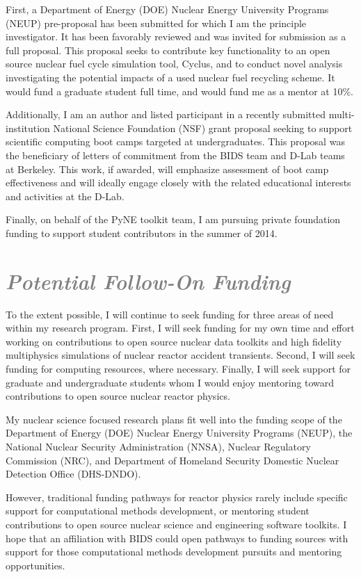 \documentclass[a4paper, 10pt]{article}
\begin{document}
First, a Department of Energy (DOE) Nuclear Energy University Programs (NEUP) 
pre-proposal has been submitted for which I am the principle investigator. It 
has been favorably reviewed and was invited for submission as a full proposal. 
This proposal seeks to contribute key functionality to an open source nuclear 
fuel cycle simulation tool, Cyclus, and to conduct novel analysis investigating 
the potential impacts of a used nuclear fuel recycling scheme. It would fund a 
graduate student full time, and would fund me as a mentor at 10\%. 

Additionally, I am an author and listed participant in a recently submitted 
multi-institution National Science Foundation (NSF) grant proposal seeking to 
support scientific computing boot camps targeted at undergraduates. This proposal 
was the beneficiary of letters of commitment from the BIDS team and D-Lab teams 
at Berkeley. This work, if awarded, will emphasize assessment of boot camp 
effectiveness and will ideally engage closely with the related educational 
interests and activities at the D-Lab.

Finally, on behalf of the PyNE toolkit team, I am pursuing private foundation 
funding to support student contributors in the summer of 2014.

\section*{\textcolor{gray}{\it Potential Follow-On Funding }}

To the extent possible, I will continue to seek funding for three areas of need 
within my research program. First, I will seek funding for my own time and 
effort working on contributions to open source nuclear data toolkits and high 
fidelity multiphysics simulations of nuclear reactor accident transients. 
Second, I will seek funding for computing resources, where necessary. Finally, I 
will seek support for graduate and undergraduate students whom I would enjoy 
mentoring toward contributions to open source nuclear reactor physics. 

My nuclear science focused research plans fit well into the funding scope of the 
Department of Energy (DOE) Nuclear Energy University Programs (NEUP), the 
National Nuclear Security Administration (NNSA), Nuclear Regulatory Commission 
(NRC), and Department of Homeland Security Domestic Nuclear Detection Office 
(DHS-DNDO).  

However, traditional funding pathways for reactor physics rarely include 
specific support for computational methods development, or mentoring student 
contributions to open source nuclear science and engineering software toolkits. 
I hope that an affiliation with BIDS could open pathways to funding sources with 
support for those computational methods development pursuits and mentoring opportunities. 
\end{document}
